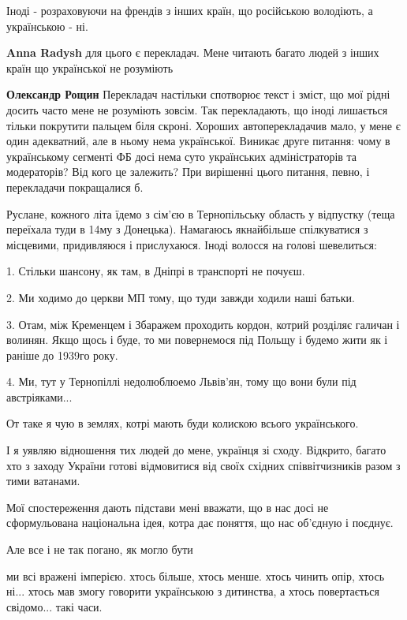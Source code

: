 \begin{itemize}
Іноді - розраховуючи на френдів з інших країн, що російською володіють, а українською - ні.

\begin{itemize} %
\textbf{Anna Radysh} для цього є перекладач. Мене читають багато людей з інших країн що української не розуміють

\textbf{Олександр Рощин}
Перекладач настільки спотворює текст і зміст, що мої рідні досить часто мене не розуміють зовсім.
Так перекладають, що іноді лишається тільки покрутити пальцем біля скроні.
Хороших автоперекладачив мало, у мене є один адекватний, але в ньому нема української.
Виникає друге питання: чому в українському сегменті ФБ досі нема суто українських адміністраторів та модераторів?
Від кого це залежить?
При вирішенні цього питання, певно, і перекладачи покращалися б.
\end{itemize} %


Руслане, кожного літа їдемо з сім'єю в Тернопільську область у відпустку (теща
переїхала туди в 14му з Донецька). Намагаюсь якнайбільше спілкуватися з
місцевими, придивляюся і прислухаюся. Іноді волосся на голові шевелиться:

1. Стільки шансону, як там, в Дніпрі в транспорті не почуєш.

2. Ми ходимо до церкви МП тому, що туди завжди ходили наші батьки.

3. Отам, між Кременцем і Збаражем проходить кордон, котрий розділяє галичан і
волинян. Якщо щось і буде, то ми повернемося під Польщу і будемо жити як і
раніше до 1939го року.

4. Ми, тут у Тернопіллі недолюблюемо Львів'ян, тому що вони були під австріяками...

От таке я чую в землях, котрі мають буди колискою всього українського.

І я уявляю відношення тих людей до мене, українця зі сходу. Відкрито, багато
хто з заходу України готові відмовитися від своїх східних співвітчизників разом
з тими ватанами.

Мої спостереження дають підстави мені вважати, що в нас досі не сформульована
національна ідея, котра дає поняття, що нас об'єдную і поєднує.

Але все і не так погано, як могло бути

\begin{itemize} %

ми всі вражені імперією. хтось більше, хтось менше. хтось чинить опір, хтось
ні... хтось мав змогу говорити українською з дитинства, а хтось повертається
свідомо... такі часи.



\end{itemize}
\end{itemize}
